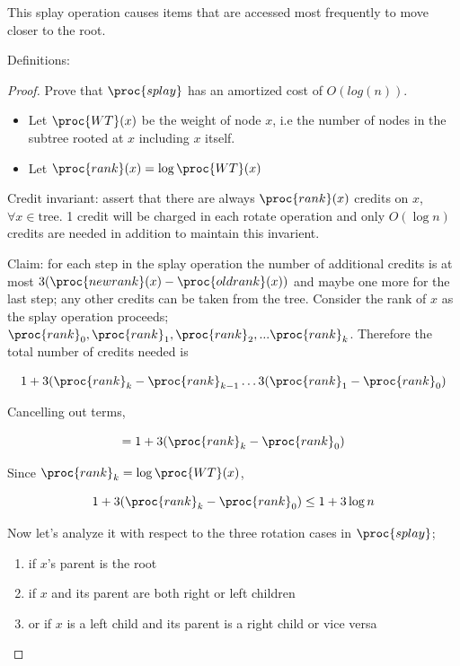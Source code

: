 \documentclass[../notes.tex]{subfiles}
\begin{document}
This splay operation causes items that are accessed most frequently to move closer to the root.

Definitions:
\begin{proof}
	Prove that $ \proc{splay} $ has an amortized cost of $ O(log(n)) $.

	\begin{itemize}
		\item Let $ \proc{WT}(x) $ be the weight of node $ x $, i.e the number of nodes in the subtree rooted at $ x $ including $ x $ itself.
		\item Let $ \proc{rank}(x) = \log \proc{WT}(x) $ 
	\end{itemize}


	Credit invariant: assert that there are always $ \proc{rank}(x) $ credits on $ x $, $ \forall x \in \text{tree} $. 1 credit will be charged in each rotate operation and only $ O(\log n) $ credits are needed in addition to maintain this invarient.


	Claim: for each step in the splay operation the number of additional credits is at most $ 3(\proc{new rank}(x) - \proc{old rank}(x))$ and maybe one more for the last step; any other credits can be taken from the tree.
	Consider the rank of $ x $ as the splay operation proceeds; $ \proc{rank}_0, \proc{rank}_1, \proc{rank}_2, ... \proc{rank}_k $.
	Therefore the total number of credits needed is 

	\begin{equation}
		 1 + 3(\proc{rank}_k - \proc{rank}_{k-1} \ldots 3(\proc{rank}_1 - \proc{rank}_0)
	\end{equation}

	Cancelling out terms,

	\begin{equation}
		 =  1 + 3(\proc{rank}_k - \proc{rank}_0)
	\end{equation}


	Since $ \proc{rank}_k = \log \proc{WT}(x) $, 

	\begin{equation}
		 1 + 3(\proc{rank}_k - \proc{rank}_0) \le  1 + 3 \log n
	\end{equation}


	Now let's analyze it with respect to the three rotation cases in $ \proc{splay} $; 
	\begin{enumerate}
		\item if $ x $'s parent is the root
		\item if $ x $ and its parent are both right or left children
		\item or if $ x $ is a left child and its parent is a right child or vice versa
	\end{enumerate}


\end{proof}
\end{document}
